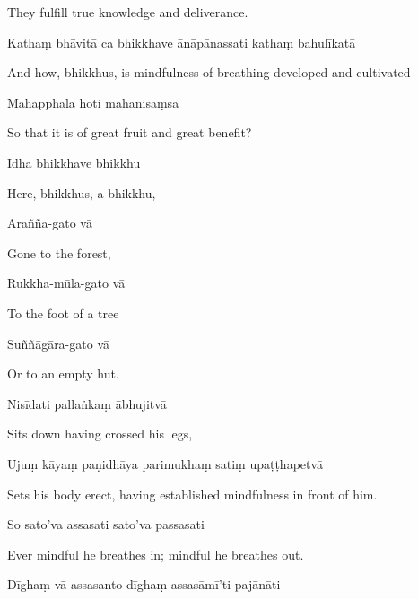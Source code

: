 \begin{english}
  They fulfill true knowledge and deliverance.
\end{english}

Kathaṃ bhāvitā ca bhikkhave ānāpānassati kathaṃ bahulīkatā

\begin{english}
  And how, bhikkhus, is mindfulness of breathing developed and cultivated
\end{english}

Mahapphalā hoti mahānisaṃsā

\begin{english}
  So that it is of great fruit and great benefit?
\end{english}

Idha bhikkhave bhikkhu

\begin{english}
  Here, bhikkhus, a bhikkhu,
\end{english}

Arañña-gato vā

\begin{english}
  Gone to the forest,
\end{english}

Rukkha-mūla-gato vā

\begin{english}
  To the foot of a tree
\end{english}

Suññāgāra-gato vā

\begin{english}
  Or to an empty hut.
\end{english}

Nisīdati pallaṅkaṃ ābhujitvā

\begin{english}
  Sits down having crossed his legs,
\end{english}

Ujuṃ kāyaṃ paṇidhāya parimukhaṃ satiṃ upaṭṭhapetvā

\begin{english}
  Sets his body erect, having established mindfulness in front of him.
\end{english}

So sato'va assasati sato'va passasati

\begin{english}
  Ever mindful he breathes in; mindful he breathes out.
\end{english}

Dīghaṃ vā assasanto dīghaṃ assasāmī'ti pajānāti

